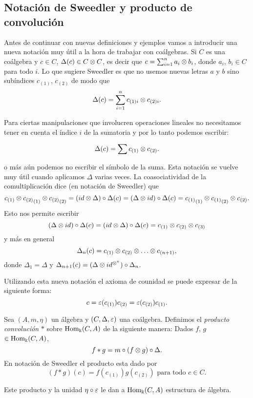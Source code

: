 \documentclass[a4paper,oneside,fleqn,11pt,../tesis.tex]{subfiles}
\begin{document}
\subsection{Notación de Sweedler y producto de convolución}
Antes de continuar con nuevas definiciones y ejemplos vamos a introducir una nueva notación muy útil a la hora
de trabajar con coálgebras. Si $C$ es una coálgebra y $c \in C$, $\Delta(c) \in C \otimes C$, es decir que
$c = \sum_{i = 1}^n a_i \otimes b_i$, donde $a_i$, $b_i \in C$ para todo $i$. Lo que sugiere Sweedler es que no usemos nuevas
letras $a$ y $b$ sino subíndices $c_{(1)}$, $c_{(2)}$ de modo que
\[
	\Delta(c) = \sum_{i = 1}^n c_{(1)i} \otimes c_{(2)i}.
\]

Para ciertas manipulaciones que involucren operaciones lineales no necesitamos tener en cuenta el índice $i$ de la
sumatoria y por lo tanto podemos escribir:

\[
	\Delta(c) = \sum c_{(1)} \otimes c_{(2)}.
\]

o más aún podemos no escribir el símbolo de la suma. Esta notación se vuelve muy útil cuando aplicamos $\Delta$
varias veces. La coasociatividad de la comultiplicación dice (en notación de Sweedler) que
\[
	c_{(1)} \otimes {c_{(2)}}_{(1)} \otimes {c_{(2)}}_{(2)} = (id \otimes \Delta) \circ \Delta (c)
	= (\Delta \otimes id) \circ \Delta(c) = {c_{(1)}}_{(1)} \otimes {c_{(1)}}_{(2)} \otimes c_{(2)}.
\]
Esto nos permite escribir
\[
	(\Delta \otimes id) \circ \Delta (c) = (id \otimes \Delta) \circ \Delta(c) = c_{(1)} \otimes c_{(2)} \otimes c_{(3)}
\]
y más en general
\[
	\Delta_n(c) = c_{(1)} \otimes c_{(2)} \otimes \ldots \otimes c_{(n + 1)},
\]
donde $\Delta_1 = \Delta$ y $\Delta_{n + 1}(c) = (\Delta \otimes id^{\otimes^n}) \circ \Delta_{n}$.

Utilizando esta nueva notación el axioma de counidad se puede expresar de la siguiente forma:
\[
	c = \varepsilon(c_{(1)}) c_{(2)} = \varepsilon(c_{(2)}) c_{(1)}.
\]

\begin{definition}
	Sea $\left(A, m, \eta \right)$ un álgebra y $\left(C, \Delta, \varepsilon \right)$ una coálgebra. Definimos el
	\emph{producto convolución} $\ast$ sobre $\operatorname{Hom}_{\Bbbk}(C, A)$ de la siguiente manera: Dados $f$, $g$ $\in \operatorname{Hom}_{\Bbbk}(C, A)$,
	\[
		f \ast g = m \circ (f \otimes g) \circ \Delta. 	
	\]
	En notación de Sweedler el producto esta dado por
	\[
		(f \ast g)(c) = f(c_{(1)})g(c_{(2)}) \text{ para todo } c \in C.
	\]
\end{definition}

Este producto y la unidad $\eta \circ \varepsilon$ le dan a $\operatorname{Hom}_{\Bbbk}(C, A)$ estructura de álgebra.
\end{document}
